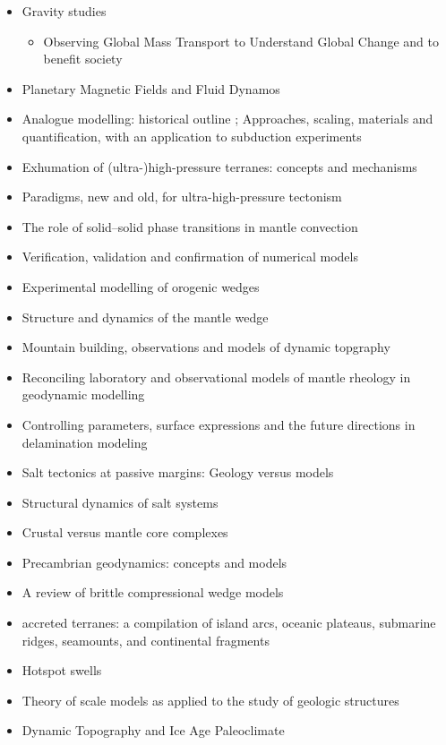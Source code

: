\begin{itemize}
\item Gravity studies
   \begin{itemize}
   \item Observing Global Mass Transport to Understand Global Change and to benefit society \cite{pabb15}
   \end{itemize}

\item Planetary Magnetic Fields and Fluid Dynamos \cite{jone11}


\item Analogue modelling: historical outline \cite{koyi97}; Approaches, scaling, materials and quantification, with an application to subduction experiments \cite{scst16}
\item Exhumation of (ultra-)high-pressure terranes: concepts and mechanisms \cite{warr13}
\item Paradigms, new and old, for ultra-high-pressure tectonism \cite{hage13}
\item The role of solid–solid phase transitions in mantle convection \cite{fada17}
\item Verification, validation and confirmation of numerical models \cite{orsb94}
\item Experimental modelling of orogenic wedges \cite{grmd12}
\item Structure and dynamics of the mantle wedge \cite{vank03}
\item Mountain building, observations and models of dynamic topgraphy \cite{flgm13,fabc13}
\item Reconciling laboratory and observational models of mantle rheology in geodynamic modelling \cite{king16}
\item Controlling parameters, surface expressions and the future directions in delamination modeling \cite{goue18}
\item Salt tectonics at passive margins: Geology versus models \cite{brfo11}
\item Structural dynamics of salt systems \cite{javs94}
\item Crustal versus mantle core complexes \cite{brst18}
\item Precambrian geodynamics: concepts and models \cite{gery14}
\item A review of brittle compressional wedge models \cite{buit12}
\item accreted terranes: a compilation of island arcs, oceanic
      plateaus, submarine ridges, seamounts, and continental fragments \cite{tebu14}
\item Hotspot swells \cite{kiad14}
\item Theory of scale models as applied to the study of geologic structures \cite{hubb37}
\item Dynamic Topography and Ice Age Paleoclimate \cite{miac20}
\end{itemize}

